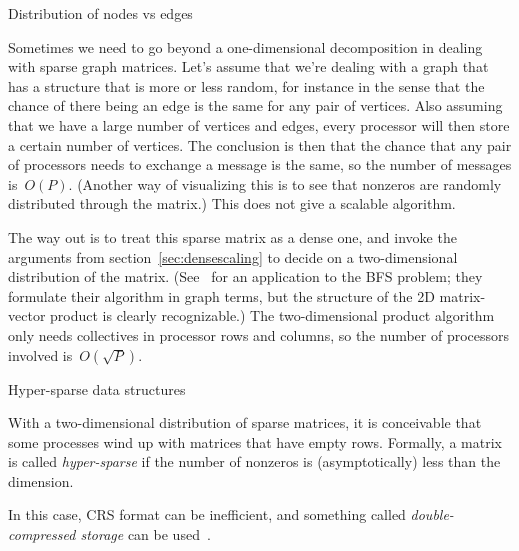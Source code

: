  {Distribution of nodes vs edges}

Sometimes we need to go beyond a one-dimensional decomposition in dealing
with sparse graph matrices.
Let's assume that we're dealing with a graph that has a structure that
is more or less random, for instance in the sense that the chance of
there being an edge is the same for any pair of vertices. Also
assuming that we have a large number of vertices and edges, every
processor will then store a certain number of vertices. The conclusion
is then that the chance that any pair of processors needs to exchange
a message is the same, so the number of messages is~$O(P)$. (Another
way of visualizing this is to see that nonzeros are randomly
distributed through the matrix.) This does not give a scalable
algorithm.

The way out is to treat this sparse matrix as a dense one, and invoke
the arguments from section~\ref{sec:densescaling} to decide on a
two-dimensional distribution of the matrix.
(See~\cite{Yoo:2005:scalable-bfs} for an application to the \ac{BFS}
problem; they formulate their algorithm in graph terms, but the
structure of the 2D matrix-vector product is clearly recognizable.)
The two-dimensional product algorithm only needs collectives in
processor rows and columns, so the number of processors involved
is~$O(\sqrt P)$.

 {Hyper-sparse data structures}

With a two-dimensional distribution of sparse matrices,
it is conceivable that some processes wind up with matrices
that have empty rows. Formally, a matrix is called
\emph{hyper-sparse}
if the number of nonzeros is (asymptotically) less than the dimension.

In this case, \ac{CRS} format can be inefficient,
and something called
\emph{double-compressed storage}
can be used~\cite{BulucGilbert:hypersparse}.

\endinput

Triadic closure: if $(i,j)\in E$ and $(i,k)\in E$ then $(j,k)\in E$;
example: friend or trust relationship.

A \indextermsub{scale-free}{network}, or one that observes a
\indexterm{power law}, is one where the fraction of nodes with
degree~$k$ is proportional to $k^{-\gamma}$ where $\gamma$ is
positive, typically $2<\gamma<3$. There are claims that graphs such as
the \ac{WWW} obey power laws; this is a claim about the logical
structure, not the physical one, which is very hard to
infer~\cite{Willinger:internet}.

A small-world network can be created by extending an existing network
by \emph{preferential attachment}:
the chance of attaching a new node is proportional to the degree
of the old node.

Power law networks usually have a very small diameter.

